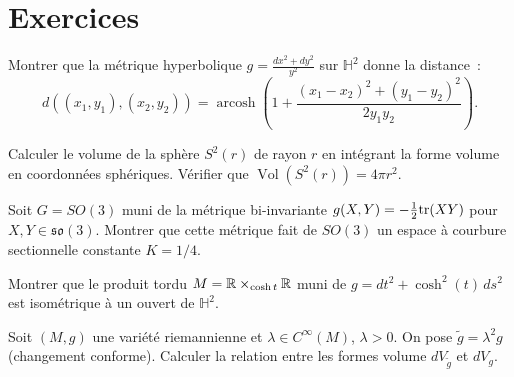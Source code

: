 \section{Exercices}

\begin{exercice}
Montrer que la m\'etrique hyperbolique $g = \frac{dx^2 + dy^2}{y^2}$ sur
$\mathbb{H}^2$ donne la distance~:
\[
    d((x_1, y_1), (x_2, y_2))
    = \operatorname{arcosh}\!\left(1 + \frac{(x_1-x_2)^2 + (y_1-y_2)^2}{2 y_1 y_2}\right).
\]
\end{exercice}

\begin{exercice}
Calculer le volume de la sph\`ere $S^2(r)$ de rayon $r$ en int\'egrant la forme volume
en coordonn\'ees sph\'eriques. V\'erifier que $\operatorname{Vol}(S^2(r)) = 4\pi r^2$.
\end{exercice}

\begin{exercice}
Soit $G = SO(3)$ muni de la m\'etrique bi-invariante $g(X, Y) = -\frac{1}{2}\mathrm{tr}(XY)$
pour $X, Y \in \mathfrak{so}(3)$. Montrer que cette m\'etrique fait de $SO(3)$ un
espace \`a courbure sectionnelle constante $K = 1/4$.
\end{exercice}

\begin{exercice}
Montrer que le produit tordu $M = \mathbb{R} \times_{\cosh t} \mathbb{R}$ muni de
$g = dt^2 + \cosh^2(t)\, ds^2$ est isom\'etrique \`a un ouvert de $\mathbb{H}^2$.
\end{exercice}

\begin{exercice}
Soit $(M, g)$ une vari\'et\'e riemannienne et $\lambda \in C^\infty(M)$, $\lambda > 0$.
On pose $\tilde{g} = \lambda^2 g$ (changement conforme). Calculer la relation entre
les formes volume $dV_{\tilde{g}}$ et $dV_g$.
\end{exercice}
